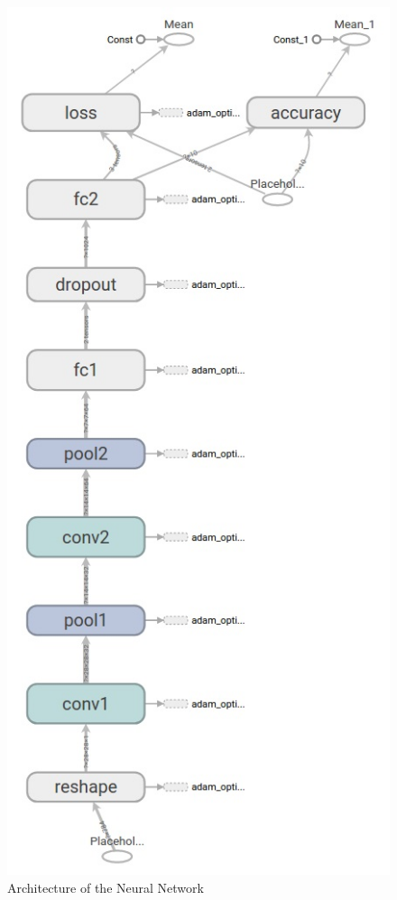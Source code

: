 \documentclass{article}
\begin{document}
\begin{figure}[ht]
  \centering
  \includegraphics[scale=0.6]{images/mnist_deep.jpg}
  \caption{Architecture of the Neural Network}
  \label{fig:mnist_deep}
\end{figure}
\end{document}
